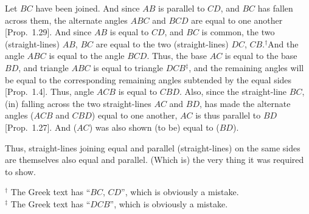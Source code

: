 \begin{Parallel}{}{}
{Let $BC$ have been joined. And since $AB$ is parallel to $CD$, and $BC$ has
fallen across them, the alternate angles $ABC$ and $BCD$ are equal to one another [Prop.~1.29]. And since $AB$ is equal to $CD$, and $BC$ is common,
the two (straight-lines) $AB$, $BC$ are equal to the two (straight-lines)
$DC$, $CB$.$^\dag$And the angle $ABC$ is equal to the angle $BCD$. Thus, the
base $AC$ is equal to the base $BD$, and triangle $ABC$ is equal to triangle
$DCB$$^\ddag$, and the remaining angles will be equal to the corresponding remaining
angles subtended by the equal sides [Prop.~1.4]. Thus,  angle $ACB$ 
is equal to $CBD$. Also, since the straight-line $BC$, (in) falling across the two
straight-lines $AC$ and $BD$, has made the alternate angles  ($ACB$ and $CBD$) equal to one another,
$AC$ is thus parallel to $BD$ [Prop.~1.27]. And ($AC$) was also shown (to be) equal
to ($BD$).

Thus, straight-lines joining equal and parallel (straight-lines) on the same sides
are  themselves also equal and parallel. (Which is) the very thing it was
required to show.}
\end{Parallel}
{\footnotesize \noindent$^\dag$ The Greek text has ``$BC$, $CD$'', which is obviously a mistake.} \\
{\footnotesize \noindent$^\ddag$ The Greek text has ``$DCB$'', which is obviously a mistake.} 

